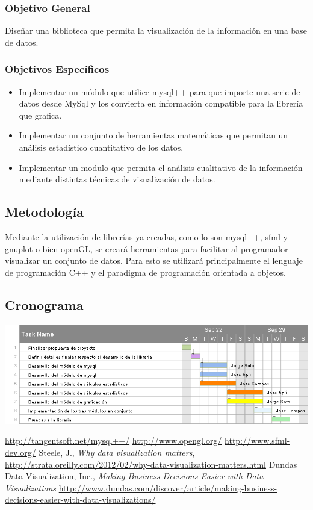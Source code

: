 \documentclass[11pt]{article}
\begin{document}
\subsubsection*{Objetivo General}
Diseñar una biblioteca que permita la visualización de la información en una base de datos.

\subsubsection*{Objetivos Específicos}
\begin{itemize}
\item Implementar un módulo que utilice mysql++ para que importe una serie de datos desde MySql 
      y los convierta en información compatible para la librería que grafica.
\item Implementar un conjunto de herramientas matemáticas que permitan un análisis
	  estadístico cuantitativo de los datos.
\item Implementar un modulo que permita el análisis cualitativo de la información mediante 
	  distintas técnicas de visualización de datos.
\end{itemize}

\subsection*{Metodología}
Mediante la utilización de librerías ya creadas, como lo son mysql++, sfml 
y gnuplot o bien openGL, se creará herramientas para facilitar al programador 
visualizar un conjunto de datos. Para esto se utilizará principalmente el
lenguaje de programación C++ y el paradigma de programación orientada a objetos.

\subsection*{Cronograma}

\includegraphics[scale=0.7]{ganttChart}

\begin{thebibliography}{10}
\url{http://tangentsoft.net/mysql++/}
\url{http://www.opengl.org/}
\url{http://www.sfml-dev.org/}
Steele, J., \textit{Why data visualization matters}, 
		\url{http://strata.oreilly.com/2012/02/why-data-visualization-matters.html}
Dundas Data Visualization, Inc., \textit{Making Business Decisions Easier with Data Visualizations}
		\url{http://www.dundas.com/discover/article/making-business-decisions-easier-with-data-visualizations/}
\end{thebibliography}
\end{document}
